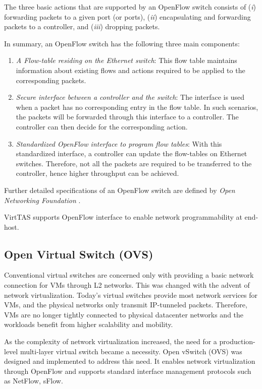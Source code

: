 The three basic actions that are supported by an OpenFlow switch consists of (\emph{i}) 
forwarding packets to a given port (or ports), (\emph{ii}) encapsulating and forwarding 
packets to a controller, and (\emph{iii}) dropping packets.


In summary, an OpenFlow switch has the following three main components:
\begin{enumerate}
    \item \emph{A Flow-table residing on the Ethernet switch}: This flow table maintains 
    information about existing flows and actions required to be applied to the corresponding 
    packets.
    \item \emph{Secure interface between a controller and the switch}: The interface is used 
    when a packet has no corresponding entry in the flow table. In such scenarios, the packets 
    will be forwarded through this interface to a controller. The controller can then decide 
    for the corresponding action.
    \item \emph{Standardized OpenFlow interface to program flow tables}: With this standardized
    interface, a controller can update the flow-tables on Ethernet switches. Therefore, not 
    all the packets are required to be transferred to the controller, hence higher throughput 
    can be achieved. 
\end{enumerate}

Further detailed specifications of an OpenFlow switch are defined by 
\emph{Open Networking Foundation} \cite{specification2009version}. 

VirtTAS supports OpenFlow interface to enable network programmability at end-host.

\subsection{Open Virtual Switch (OVS)}
\label{OVS}

Conventional virtual switches are concerned only with providing a basic network connection 
for VMs through L2 networks. This was changed with the advent of network virtualization. 
Today's virtual switches provide most network services for VMs, and the physical networks 
only transmit IP-tunneled packets. Therefore, VMs are no longer tightly connected to physical 
datacenter networks and the workloads benefit from higher scalability and mobility.

As the complexity of network virtualization increased, the need for a production-level 
multi-layer virtual switch became a necessity. Open vSwitch (OVS) was designed and implemented 
to address this need. It enables network virtualization through OpenFlow and supports standard 
interface management protocols such as NetFlow\cite{claise2004cisco}, sFlow\cite{wang2004sflow}.

